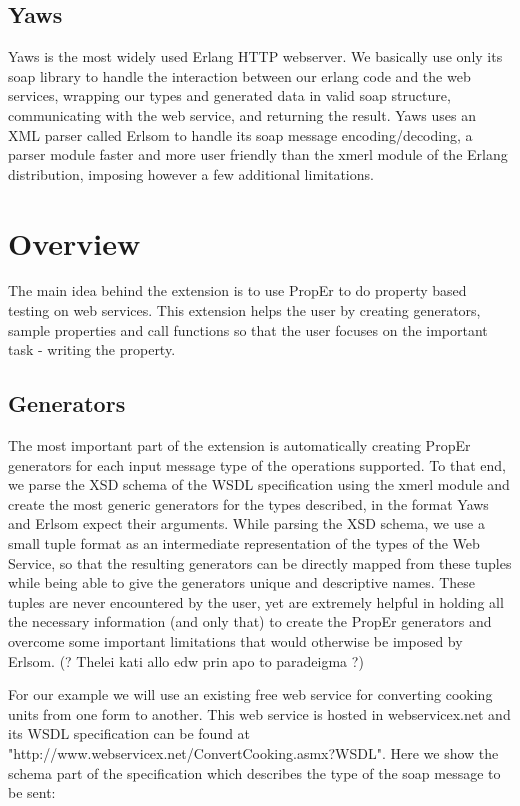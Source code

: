 \documentclass[11pt]{article} %
\begin{document}
\subsection{Yaws}

Yaws is the most widely used Erlang HTTP webserver. We basically use only its soap library to handle the interaction between our erlang code and the web services, wrapping our types and generated data in valid soap structure, communicating with the web service, and returning the result. Yaws uses an XML parser called Erlsom to handle its soap message encoding/decoding, a parser module faster and more user friendly than the xmerl module of the Erlang distribution, imposing however a few additional limitations.

\section{Overview}

The main idea behind the extension is to use PropEr to do property based testing on web services. This extension helps the user by creating generators, sample properties and call functions so that the user focuses on the important task - writing the property. 

\subsection{Generators}

The most important part of the extension is automatically creating PropEr generators for each input message type of the operations supported. To that end, we parse the XSD schema of the WSDL specification using the xmerl module and create the most generic generators for the types described, in the format Yaws and Erlsom expect their arguments. While parsing the XSD schema, we use a small tuple format as an intermediate representation of the types of the Web Service, so that the resulting generators can be directly mapped from these tuples while being able to give the generators unique and descriptive names. These tuples are never encountered by the user, yet are extremely helpful in holding all the necessary information (and only that) to create the PropEr generators and overcome some important limitations that would otherwise be imposed by Erlsom. (? Thelei kati allo edw prin apo to paradeigma ?)

For our example we will use an existing free web service for converting cooking units from one form to another. This web service is hosted in webservicex.net and its WSDL specification can be found at "http://www.webservicex.net/ConvertCooking.asmx?WSDL". Here we show the schema part of the specification which describes the type of the soap message to be sent:
\end{document}
